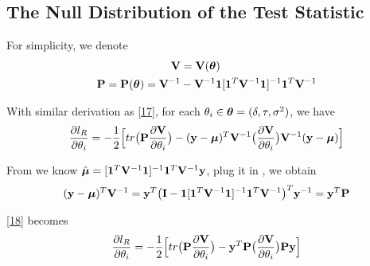 \documentclass[11pt]{article}
\begin{document}
\subsection{\textbf{The Null Distribution of the Test Statistic}}
For simplicity, we denote
\begin{align*}
{\bf V}&={\bf V}(\boldsymbol{\theta})\\
{\bf P}={\bf P}(\boldsymbol{\theta})={\bf V}^{-1}&-{\bf V}^{-1}\mathbf{1}[\mathbf{1}^T{\bf V}^{-1}\mathbf{1}]^{-1}\mathbf{1}^T{\bf V}^{-1}
\end{align*}

With similar derivation as \eqref{17}, for each $\theta_i \in \boldsymbol{\theta}=(\delta, \tau, \sigma^2)$, we have
\begin{align}
\frac{\partial l_R}{\partial \theta_i}=-\frac{1}{2}\Big[tr\big({\bf P} \frac{\partial {\bf V}}{\partial \theta_i}\big)-({\bf y}-\boldsymbol{\mu})^T{\bf V}^{-1}\big(\frac{\partial {\bf V}}{\partial \theta_i}\big){\bf V}^{-1}({\bf y}-\boldsymbol{\mu})\Big] \label{18}
\end{align}

From \citep{liu_semiparametric_2007} we know $\hat{\boldsymbol{\mu}}=[\mathbf{1}^T{\bf V}^{-1}\mathbf{1}]^{-1}\mathbf{1}^T{\bf V}^{-1}{\bf y}$, plug it in \citep{lin_inference_1999}, we obtain 
\begin{align*}
({\bf y}-\boldsymbol{\mu})^T{\bf V}^{-1}={\bf y}^T \big({\bf I}-\mathbf{1}[\mathbf{1}^T{\bf V}^{-1}\mathbf{1}]^{-1}\mathbf{1}^T{\bf V}^{-1}\big)^T{\bf y}^{-1}={\bf y}^T {\bf P}
\end{align*}

\eqref{18} becomes 
\begin{align*}
\frac{\partial l_R}{\partial \theta_i}=-\frac{1}{2}\Big[tr\big({\bf P} \frac{\partial {\bf V}}{\partial \theta_i}\big)-{\bf y}^T {\bf P}\big(\frac{\partial {\bf V}}{\partial \theta_i}\big){\bf P} {\bf y} \Big]
\end{align*}
\end{document}
